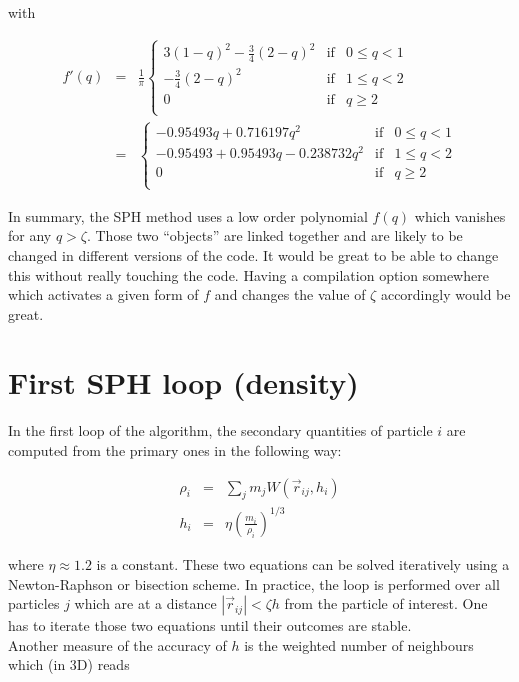 \documentclass[a4paper,10pt]{report}
\begin{document}
with

\begin{eqnarray*}
  f'(q)&=& \frac{1}{\pi}\left\lbrace \begin{array}{rcl}
                      3 \left(1-q\right)^2-\frac{3}{4} \left(2-q\right)^2 & \mbox{if} &
0 \leq q < 1 \\
 		      -\frac{3}{4} \left(2-q\right)^2 & \mbox{if} & 1 \leq q < 2 \\
		      0 & \mbox{if} & q \geq 2 \\
                     \end{array}
 \right. \\
&=&\left\lbrace \begin{array}{rcl}
    -0.95493 q + 0.716197 q^2& \mbox{if} & 0 \leq q < 1 \\
   -0.95493+0.95493 q-0.238732 q^2  & \mbox{if} & 1 \leq q < 2 \\
		      0 & \mbox{if} & q \geq 2 \\
                     \end{array}
 \right.
\end{eqnarray*}

In summary, the SPH method uses a low order polynomial $f(q)$ which vanishes for any $q>\zeta$. Those two ``objects''
are linked together and are likely to be changed in different versions of the code. It would be great to be able to
change this without really touching the code. 
Having a compilation option somewhere which activates a given form of $f$ and changes the value of $\zeta$ accordingly
would be great.

\section{First SPH loop (density)}
\label{sec:density}

In the first loop of the algorithm, the secondary quantities of particle $i$ are computed from the primary ones in the
following way:

\begin{eqnarray}
 \rho_i &=& \sum_j m_j W(\vec{r}_{ij}, h_i)\\
 h_i &=& \eta \left(\frac{m_i}{\rho_i} \right)^{1/3}
\end{eqnarray}

where $\eta \approx 1.2$ is a constant. These two equations can be solved iteratively using a Newton-Raphson or
bisection scheme. In practice, the loop is performed over all particles $j$ which are at a distance
$|\vec{r}_{ij}|<\zeta
h$ from the particle of interest. One has to iterate those two equations until their outcomes are stable.\\
Another measure of the accuracy of $h$ is the weighted number of neighbours which (in 3D) reads
\end{document}
